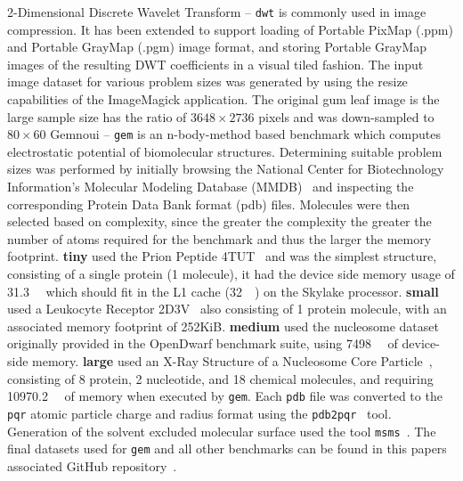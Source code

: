 \documentclass[../document.tex]{subfiles}
\begin{document}
2-Dimensional Discrete Wavelet Transform -- {\tt dwt} is commonly used in image compression.
It has been extended to support loading of Portable PixMap (.ppm) and Portable GrayMap (.pgm) image format, and storing Portable GrayMap images of the resulting DWT coefficients in a visual tiled fashion.
The input image dataset for various problem sizes was generated by using the resize capabilities of the ImageMagick application.
The original gum leaf image is the large sample size has the ratio of $3648 \times 2736$ pixels and was down-sampled to  $80 \times 60$ 
Gemnoui -- {\tt gem} is an n-body-method based benchmark which computes electrostatic potential of biomolecular structures.
Determining suitable problem sizes was performed by initially browsing the National Center for Biotechnology Information's Molecular Modeling Database (MMDB)~\cite{madej2013mmdb} and inspecting the corresponding Protein Data Bank format (pdb) files.
Molecules were then selected based on complexity, since the greater the complexity the greater the number of atoms required for the benchmark and thus the larger the memory footprint.
{\bf tiny} used the Prion Peptide 4TUT~\cite{yu2015crystal} and was the simplest structure, consisting of a single protein (1 molecule), it had the device side memory usage of \SI{31.3}{\kibi\byte} which should fit in the L1 cache (\SI{32}{\kibi\byte}) on the Skylake processor.
{\bf small} used a Leukocyte Receptor 2D3V~\cite{shiroishi2006crystal} also consisting of 1 protein molecule, with an associated memory footprint of 252KiB.
{\bf medium} used the nucleosome dataset originally provided in the OpenDwarf benchmark suite, using \SI{7498}{\kibi\byte} of device-side memory.
{\bf large} used an X-Ray Structure of a Nucleosome Core Particle~\cite{davey2002solvent}, consisting of 8 protein, 2 nucleotide, and 18 chemical molecules, and requiring \SI{10970.2}{\kibi\byte} of memory when executed by {\tt gem}.
Each {\tt pdb} file was converted to the {\tt pqr} atomic particle charge and radius format using the {\tt pdb2pqr}~\cite{dolinsky2004pdb2pqr} tool.
Generation of the solvent excluded molecular surface used the tool {\tt msms}~\cite{sanner1996reduced}.
The final datasets used for {\tt gem} and all other benchmarks can be found in this papers associated GitHub repository~\cite{johnston2017}.

\end{document}
